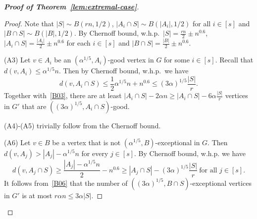 \documentclass[11pt, a4paper]{article}
\theoremstyle{definition}
\newcommand{\<}{\subseteq}
\begin{document}
\begin{proof}[{\bf Proof of Theorem~\ref{lem:extremal-case}}]
\begin{proof}%
Note that $|S|\sim B(rn,1/2)$, $|A_i\cap S|\sim B(|A_i|,1/2)$ for all $i\in[s]$ {and $|B\cap S|\sim B(|B|,1/2)$}. By Chernoff bound, w.h.p.~$|S|=\frac{rn}{2}\pm n^{0.6}$, $|A_i\cap S|=\frac{|A_i|}{2}\pm n^{0.6}$ for each $i\in [s]$ and $|B\cap S|=\frac{|B|}{2}\pm n^{0.6}$.

(A3) %
Let $v\in A_i$ be an $(\alpha^{1/5},A_i)$-good vertex in $G$ for some $i\in [s]$.  Recall that $d(v,A_i)\leq \alpha^{1/5} n$. %
Then by Chernoff bound, w.h.p.~we have $$d(v,A_i\cap S)\leq \frac{1}{2}\alpha^{1/5}n+ n^{0.6}\leq (3\alpha)^{1/5}\frac{|S|}{r}.$$ %
Together with~\ref{B03}, there are at least $|A_i\cap S|-{2}\alpha n{\ge |A_i\cap S|-6\alpha\frac{|S|}{r}}$ vertices in $G'$ that are $((3\alpha)^{1/5},A_i\cap S)$-good.\medskip

(A4)-(A5) trivially follow from the Chernoff bound. \medskip

(A6) Let $v\in B$ be a vertex that is not $(\alpha^{1/5},B)$-exceptional in $G$. 
Then $d(v,A_j) > |A_j| - \alpha^{1/5} n$ for every $j \in [s]$. 
By Chernoff bound, w.h.p. we have
\[
d(v,A_j \cap S)\geq  \frac{|A_j| - \alpha^{1/5} n}{2} - n^{0.6} \ge |A_j \cap S| - (3\alpha)^{1/5}\frac{|S|}{r} \ \text{for all } j \in [s].
\]
It follows from~\ref{B06} that the number of $((3\alpha)^{1/5},B \cap S)$-exceptional vertices in $G'$ is at most $r\alpha n\le {3\alpha |S|}$. \medskip%


\end{proof}
\end{proof}
\end{document}
